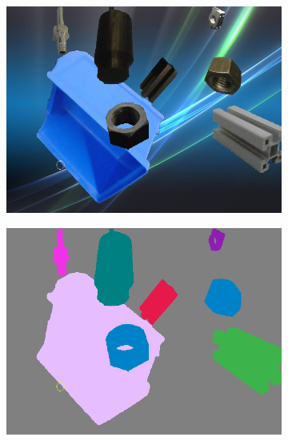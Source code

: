 \begin{figure}[h]
\begin{subfigure}{.24\textwidth}
			\includegraphics[width=1\linewidth]{images/sample_predictions/00132}
		\end{subfigure}
		\begin{subfigure}{.24\textwidth}
			\centering
			\includegraphics[width=1\linewidth]{images/sample_predictions/00132_size_gt}
		\end{subfigure}
		\begin{subfigure}{.24\textwidth}
			\centering

\end{subfigure}
\end{figure}
